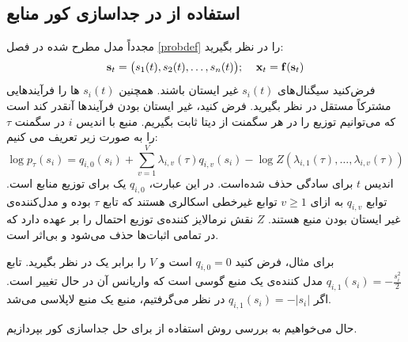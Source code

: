 \subsection{	استفاده از
	 در جداسازی کور منابع}
مجدداً مدل مطرح شده در فصل
\eqref{probdef}
را در نظر بگیرید:
\begin{equation}
\mathbf{s}_t = \big(s_1(t), s_2(t), \dots, s_n(t)\big);\;\;\;\;
\mathbf{x}_t = \mathbf{f}(\mathbf{s}_t)
\end{equation}
 فرض‌کنید سیگنال‌های 
$s_i(t)$
غیر ایستان باشند.  همچنین 
$s_i(t)$
ها را فرآیندهایی مشترکاً مستقل در نظر بگیرید. فرض کنید، غیر ایستان بودن فرآیند‌ها آنقدر کند است که می‌توانیم توزیع را در هر سگمنت از دیتا ثابت بگیریم. 
منبع با اندیس 
$i$
در سگمنت
$\tau$
را به صورت زیر تعریف می کنیم:
\begin{equation} 
\log p_\tau(s_i)=  q_{i,0}(s_i) + \sum_{v=1}^V \lambda_{i,v}(\tau) q_{i,v}(s_i) - \log Z( \lambda_{i,1}(\tau),\ldots,\lambda_{i,v}(\tau))
\label{eq:p_tau}
\end{equation}
اندیس $t$ برای سادگی حذف شده‌است.
در این عبارت،
$q_{i, 0}$
یک
برای توزیع منابع است. توابع 
$q_{i, v}$
به ازای 
$ v\geq 1$
توابع غیرخطی اسکالری هستند که تابع 
$\tau$
بوده و مدل‌کننده‌ی غیر ایستان بودن منبع هستند.
$Z$
نقش نرمالایز کننده‌ی توزیع احتمال را بر عهده دارد که در تمامی اثبات‌ها حذف می‌شود و بی‌اثر است.

\begin{example}
برای مثال، فرض کنید 
$q_{i, 0} = 0$
است و $V$ را برابر یک در نظر بگیرید. تابع
$q_{i, 1} (s_i) = -\frac{s_i^2}{2}$
مدل کننده‌ی یک منبع گوسی است که واریانس آن در حال تغییر است. اگر 
$q_{i, 1} (s_i) = -|s_i|$
در نظر می‌گرفتیم، منبع یک منبع لاپلاسی می‌شد.
\end{example}

حال می‌خواهیم به بررسی روش استفاده از 
برای حل جداسازی کور بپردازیم.

